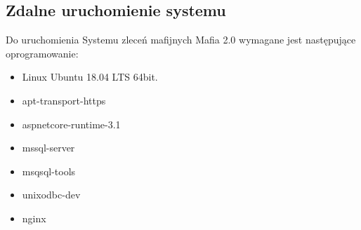 \documentclass[12pt,a4paper]{article}
\begin{document}
		\subsection{Zdalne uruchomienie systemu}
			\indent Do uruchomienia Systemu zleceń mafijnych Mafia 2.0 wymagane jest następujące oprogramowanie:
			\begin{itemize}
				\item Linux Ubuntu 18.04 LTS 64bit.
				\item apt-transport-https
				\item aspnetcore-runtime-3.1
				\item mssql-server
				\item msqsql-tools
				\item unixodbc-dev
				\item nginx
			\end{itemize}
			
\end{document}
